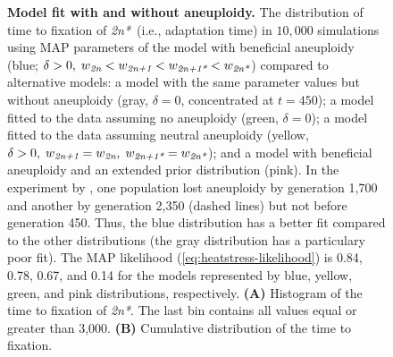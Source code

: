\documentclass[12pt]{extarticle}
\newcommand{\euwt}{\emph{2n}}
\newcommand{\anwt}{\emph{2n+1}}
\newcommand{\eumt}{\emph{2n*}}
\newcommand{\anmt}{\emph{2n+1*}}
\begin{document}
\begin{figure}[h!]
\begin{subfigure}{0.5\textwidth}
      \label{fig:fit-cumulative}
  \end{subfigure}
  \caption{
    \textbf{Model fit with and without aneuploidy.}
    The distribution of time to fixation of \eumt\ (i.e., adaptation time) in $10,000$ simulations using MAP parameters of the model with beneficial aneuploidy (blue; $\delta>0, \; w_{\euwt}<w_{\anwt}<w_{\anmt}<w_{\eumt}$) compared to alternative models: a model with the same parameter values but without aneuploidy (gray, $\delta=0$, concentrated at $t=450$); a model fitted to the data assuming no aneuploidy (green, $\delta=0$); a model fitted to the data assuming neutral aneuploidy (yellow, $\delta>0, \; w_{\anwt}=w_{\euwt}, \; w_{\anmt}=w_{\eumt}$); and a model with beneficial aneuploidy and an extended prior distribution (pink).
In the experiment by \citet{Yona2012}, one population lost aneuploidy by generation 1,700 and another by generation 2,350 (dashed lines) but not before generation 450.
Thus, the blue distribution has a better fit compared to the other distributions (the gray distribution has a particulary poor fit).
The MAP likelihood (\cref{eq:heatstress-likelihood}) is 0.84, 0.78, 0.67, and 0.14 for the models represented by blue, yellow, green, and pink distributions, respectively. 
\textbf{(A)} Histogram of the time to fixation of \eumt. The last bin contains all values equal or greater than 3,000.
\textbf{(B)} Cumulative distribution of the time to fixation. 
     }
  \label{fig:2n*-fixation}
\end{figure}



\end{document}
